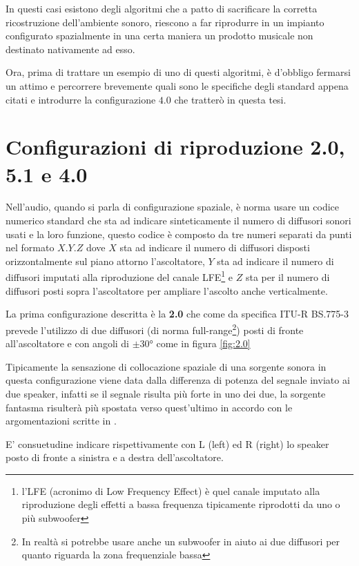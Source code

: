 \documentclass[12pt,a4paper]{report}
\begin{document}
In questi casi esistono degli algoritmi che a patto di sacrificare la corretta ricostruzione dell'ambiente sonoro, riescono a far riprodurre in un impianto configurato spazialmente in una certa maniera un prodotto musicale non destinato nativamente ad esso.

Ora, prima di trattare un esempio di uno di questi algoritmi, è d'obbligo fermarsi un attimo e percorrere brevemente quali sono le specifiche degli standard appena citati e introdurre la configurazione $4.0$ che tratterò in questa tesi.

\section{Configurazioni di riproduzione 2.0, 5.1 e 4.0}\label{metodi}

Nell'audio, quando si parla di configurazione spaziale, è norma usare un codice numerico standard che sta ad indicare sinteticamente il numero di diffusori sonori usati e la loro funzione, questo codice è composto da tre numeri separati da punti nel formato $X.Y.Z$ dove $X$ sta ad indicare il numero di diffusori disposti orizzontalmente sul piano attorno l'ascoltatore, $Y$ sta ad indicare il numero di diffusori imputati alla riproduzione del canale LFE\footnote{l'LFE (acronimo di Low Frequency Effect) è quel canale imputato alla riproduzione degli effetti a bassa frequenza tipicamente riprodotti da uno o più subwoofer} e $Z$ sta per il numero di diffusori posti sopra l'ascoltatore per ampliare l'ascolto anche verticalmente.

La prima configurazione descritta è la \textbf{2.0} che come da specifica ITU-R BS.775-3\cite{5.1} prevede l'utilizzo di due diffusori (di norma full-range\footnote{In realtà si potrebbe usare anche un subwoofer in aiuto ai due diffusori per quanto riguarda la zona frequenziale bassa}) posti di fronte all'ascoltatore e con angoli di $\pm 30°$ come in figura \ref{fig:2.0}

Tipicamente la sensazione di collocazione spaziale di una sorgente sonora in questa configurazione viene data dalla differenza di potenza del segnale inviato ai due speaker, infatti se il segnale risulta più forte in uno dei due, la sorgente fantasma risulterà più spostata verso quest'ultimo in accordo con le argomentazioni scritte in \cite{vbap}.

E' consuetudine indicare rispettivamente con L (left) ed R (right) lo speaker posto di fronte a sinistra e a destra dell'ascoltatore.
\end{document}
